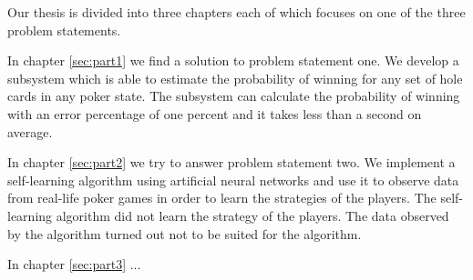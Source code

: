 Our thesis is divided into three chapters each of which focuses on one of the three problem statements.

In chapter \ref{sec:part1} we find a solution to problem statement one. We develop a subsystem which is able to estimate the probability of winning for any set of hole cards in any poker state. The subsystem can calculate the probability of winning with an error percentage of one percent and it takes less than a second on average.

In chapter \ref{sec:part2} we try to answer problem statement two. We implement a self-learning algorithm using artificial neural networks and use it to observe data from real-life poker games in order to learn the strategies of the players. The self-learning algorithm did not learn the strategy of the players. The data observed by the algorithm turned out not to be suited for the algorithm.

In chapter \ref{sec:part3} ...
